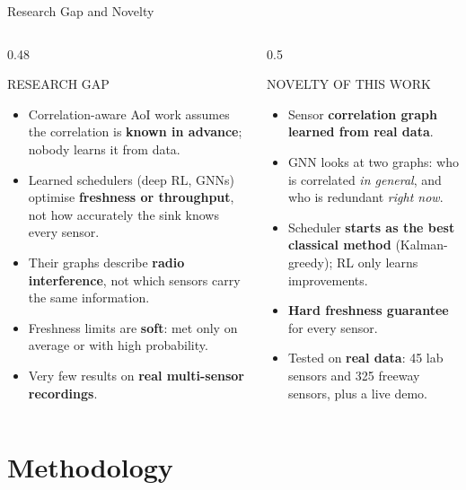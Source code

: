 \documentclass[aspectratio=169,10pt,xcolor=table]{beamer}
\newcommand{\sect}[1]{\par{\color{muted}\scriptsize\MakeUppercase{#1}}\par\vspace{0.2em}}
\begin{document}
\begin{frame}{Research Gap and Novelty}
  \begin{columns}[T]
    \begin{column}{0.48\textwidth}
      \sect{Research gap}
      \begin{itemize}\small\setlength\itemsep{0.5em}
        \item Correlation-aware AoI work assumes the correlation is \textbf{known in advance}; nobody learns it from data.
        \item Learned schedulers (deep RL, GNNs) optimise \textbf{freshness or throughput}, not how accurately the
              sink knows every sensor.
        \item Their graphs describe \textbf{radio interference}, not which sensors carry the same information.
        \item Freshness limits are \textbf{soft}: met only on average or with high probability.
        \item Very few results on \textbf{real multi-sensor recordings}.
      \end{itemize}
    \end{column}
    \begin{column}{0.5\textwidth}
      \sect{Novelty of this work}
      \begin{itemize}\small\setlength\itemsep{0.5em}
        \item[\color{good}\faCheck] Sensor \textbf{correlation graph learned from real data}.
        \item[\color{good}\faCheck] GNN looks at two graphs: who is correlated \emph{in general}, and who is redundant
              \emph{right now}.
        \item[\color{good}\faCheck] Scheduler \textbf{starts as the best classical method} (Kalman-greedy); RL only
              learns improvements.
        \item[\color{good}\faCheck] \textbf{Hard freshness guarantee} for every sensor.
        \item[\color{good}\faCheck] Tested on \textbf{real data}: 45 lab sensors and 325 freeway sensors, plus a live demo.
      \end{itemize}
    \end{column}
  \end{columns}
\end{frame}

\section{Methodology}
\end{document}
